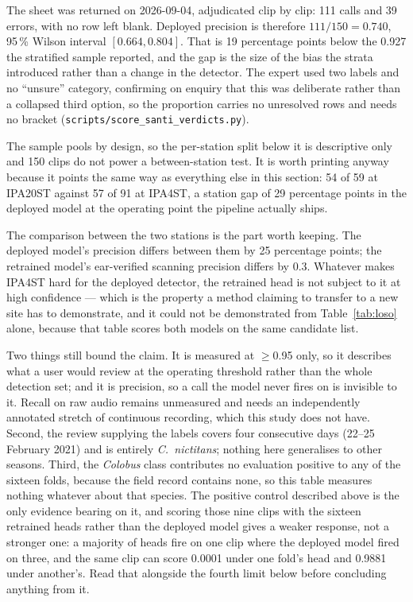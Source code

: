 \documentclass[review,3p,times]{elsarticle}
\begin{document}
The sheet was returned on 2026-09-04, adjudicated clip by clip: 111 calls and 39
errors, with no row left blank. Deployed precision is therefore
$111/150 = 0.740$, 95\,\% Wilson interval $[0.664, 0.804]$. That is 19
percentage points below the 0.927 the stratified sample reported, and the gap is
the size of the bias the strata introduced rather than a change in the detector.
The expert used two labels and no ``unsure'' category, confirming on enquiry
that this was deliberate rather than a collapsed third option, so the proportion
carries no unresolved rows and needs no bracket
(\texttt{scripts/score\_santi\_verdicts.py}).

The sample pools by design, so the per-station split below it is descriptive
only and 150 clips do not power a between-station test. It is worth printing
anyway because it points the same way as everything else in this section: 54 of
59 at IPA20ST against 57 of 91 at IPA4ST, a station gap of 29 percentage points
in the deployed model at the operating point the pipeline actually ships.

The comparison between the two stations is the part worth keeping. The deployed
model's precision differs between them by 25 percentage points; the retrained
model's ear-verified scanning precision differs by 0.3. Whatever makes IPA4ST
hard for the deployed detector, the retrained head is not subject to it at high
confidence --- which is the property a method claiming to transfer to a new site
has to demonstrate, and it could not be demonstrated from Table~\ref{tab:loso}
alone, because that table scores both models on the same candidate list.

Two things still bound the claim. It is measured at $\ge$0.95 only, so it
describes what a user would review at the operating threshold rather than the
whole detection set; and it is precision, so a call the model never fires on is
invisible to it. Recall on raw audio remains unmeasured and needs an
independently annotated stretch of continuous recording, which this study does
not have.
Second, the review supplying the labels covers four consecutive days
(22--25 February 2021) and is entirely \textit{C.\ nictitans}; nothing here
generalises to other seasons.
Third, the \textit{Colobus} class contributes no evaluation positive to any of
the sixteen folds, because the field record contains none, so this table
measures nothing whatever about that species. The positive control described
above is the only evidence bearing on it, and scoring those nine clips with the
sixteen retrained heads rather than the deployed model gives a weaker response,
not a stronger one: a majority of heads fire on one clip where the deployed
model fired on three, and the same clip can score 0.0001 under one fold's head
and 0.9881 under another's. Read that alongside the fourth limit below before
concluding anything from it.
\end{document}
